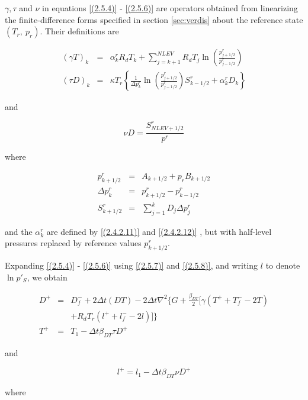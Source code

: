 $\gamma,  \tau$ and $\nu$ in equations \ref{(2.5.4)} - \ref{(2.5.6)}
are operators obtained from linearizing the finite-difference forms
specified in section \ref{sec:verdis} about the reference state $(T_r,
\ p_r)$. Their definitions are


\begin{eqnarray}
(\gamma T)_k  & = & \alpha_k^rR_dT_k 
+ \sum\limits^{NLEV}_{j=k+1}R_dT_j \ln \left(
\frac{p^r_{j+1/2}}{p^r_{j-1/2}}\right)
\label{(2.5.26)}\\
(\tau D)_k  & = & \kappa T_r\left\{\frac{1}{\Delta p^r_k} \ln \left(
\frac{p^r_{j+1/2}}{p^r_{j-1/2}}\right)S^r_{k-1/2} + \alpha^r_kD_k\right\}
\label{(2.5.27)}
\end{eqnarray}

and

\begin{equation}
\nu D = \frac{S^r_{NLEV+1/2}}{p^r}
\label{(2.5.28)}
\end{equation}

where

\begin{eqnarray}
p^r_{k+1/2} & = & A_{k+1/2} + p_rB_{k+1/2}\nonumber\\
\Delta p^r_k & = & p^r_{k+1/2} - p^r_{k-1/2}
\label{(2.5.29)}\\
S^r_{k+1/2} & = & \sum\limits^{k}_{j=1}D_j\Delta p^r_j\nonumber
\end{eqnarray}

and the $\alpha_k^r$ are defined by \ref{(2.4.2.11)} and \ref{(2.4.2.12)} , but with half-level
pressures replaced by reference values $p^r_{k+1/2}$.

Expanding \ref{(2.5.4)} - \ref{(2.5.6)} using \ref{(2.5.7)} and \ref{(2.5.8)}, and writing $l$ to
denote $\ln p'_S$, we obtain

\begin{eqnarray}
D^+ & = & D^-_f + 2\Delta t (DT) - 2\Delta t \nabla^2 
          \{G + \frac{\beta_{DT}}{2} [\gamma(T^+ + T^-_f - 2T) \nonumber \\
    &   & + R_dT_r(l^+ + l^-_f - 2l)]\}
\label{(2.5.30)}\\
T^+ & = & T_1 - \Delta t \beta_{DT} \tau D^+
\label{(2.5.31)}
\end{eqnarray}

and

\begin{equation}
l^+ = l_1 - \Delta t \beta_{DT} \nu D^+
\label{(2.5.32)}
\end{equation}

where


